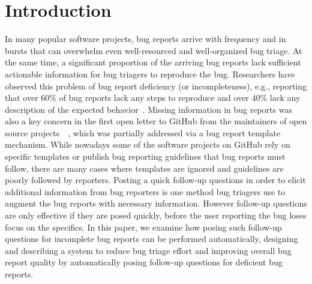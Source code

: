 \section{Introduction}

In many popular software projects, bug reports arrive with frequency and in bursts that can overwhelm even well-resourced and well-organized bug triage.
%
At the same time, a significant proportion of the arriving bug reports lack sufficient actionable information for bug triagers to reproduce the bug.
%
Researchers have observed this problem of bug report deficiency (or incompleteness), e.g., reporting that over 60\% of bug reports lack any steps to reproduce and over 40\% lack any description of the expected behavior~\cite{chaparro17detecting}.
%
Missing information in bug reports was also a key concern in the first open letter to GitHub from the maintainers of open source projects~\cite{deargithub}~\cite{breu2010information}, which was partially addressed via a bug report template mechanism.
%
While nowadays some of the software projects on GitHub rely on specific templates or publish bug reporting guidelines that bug reports must follow, there are many cases where templates are ignored and guidelines are poorly followed by reporters.
%
Posting a quick follow-up questions in order to elicit additional information from bug reporters is one method bug triagers use to augment the bug reports with necessary information.
%
However follow-up questions are only effective if they are posed quickly, before the user reporting the bug loses focus on the specifics.
%
In this paper, we examine how posing such follow-up questions for incomplete bug reports can be performed automatically, designing and describing a system to reduce bug triage effort and improving overall bug report quality by automatically posing follow-up questions for deficient bug reports.

